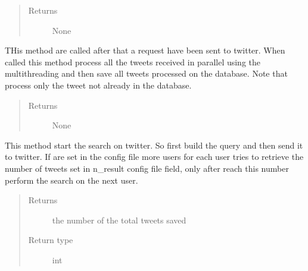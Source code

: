 \documentclass[letterpaper,10pt,english]{sphinxmanual}
\begin{document}
\begin{fulllineitems}
\begin{fulllineitems}
\begin{quote}
\begin{description}
\item[{Returns}] \leavevmode
\sphinxAtStartPar
None

\end{description}\end{quote}

\end{fulllineitems}


\begin{fulllineitems}
\label{\detokenize{code_comment/tweet_search:hate_tweet_map.tweets_searcher.SearchTweets.SearchTweets.__save}}
\sphinxAtStartPar
THis method are called after that a request have been sent to twitter. When called this method process all
the tweets received in parallel using the multithreading and then save all tweets processed on the database.
Note that process only the tweet not already in the database.
\begin{quote}\begin{description}
\item[{Returns}] \leavevmode
\sphinxAtStartPar
None

\end{description}\end{quote}

\end{fulllineitems}


\begin{fulllineitems}
\label{\detokenize{code_comment/tweet_search:hate_tweet_map.tweets_searcher.SearchTweets.SearchTweets.search}}
\sphinxAtStartPar
This method start the search on twitter. So first build the query and then send it to twitter.
If are set in the config file more users for each user tries to
retrieve the number of tweets set in n\_result config file field, only after reach this number perform the
search on the next user.
\begin{quote}\begin{description}
\item[{Returns}] \leavevmode
\sphinxAtStartPar
the number of the total tweets saved

\item[{Return type}] \leavevmode
\sphinxAtStartPar
int

\end{description}\end{quote}

\end{fulllineitems}


\end{fulllineitems}
\end{document}
